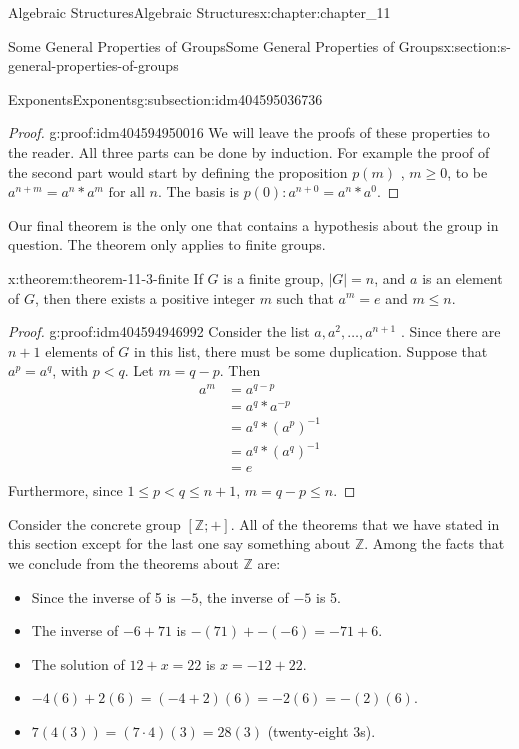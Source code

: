 \documentclass[twoside,10pt,]{book}
\numberwithin{equation}{section}
\begin{document}
\begin{chapterptx}{Algebraic Structures}{}{Algebraic Structures}{}{}{x:chapter:chapter_11}
\begin{sectionptx}{Some General Properties of Groups}{}{Some General Properties of Groups}{}{}{x:section:s-general-properties-of-groups}
\begin{subsectionptx}{Exponents}{}{Exponents}{}{}{g:subsection:idm404595036736}
\begin{proof}{}{g:proof:idm404594950016}
We will leave the proofs of these properties to the reader.  All three parts can be done by induction.  For example the proof of the second part would start by defining the proposition  \(p(m)\) , \(m\geq 0\), to be  \(a^{n+m}=a^n*a^m \textrm{ for all } n\).   The basis is \(p(0): a^{n+0}=a^n*a^0\).%
\end{proof}
Our final theorem is the only one that contains a hypothesis about the group in question. The theorem only applies to finite groups.%
\begin{theorem}{}{}{x:theorem:theorem-11-3-finite}%
If \(G\) is a finite group,  \(\left| G\right| = n\), and \(a\) is an element of \(G\), then there exists a positive integer \(m\) such that \(a^m= e\) and \(m\leq n\).%
\end{theorem}
\begin{proof}{}{g:proof:idm404594946992}
Consider the list \(a, a^2,\ldots , a^{n+1}\) . Since there are \(n + 1\) elements of \(G\) in this list, there must be some duplication.  Suppose that \(a^p=a^q\), with \(p < q\). Let \(m = q - p\).    Then%
\begin{equation*}
\begin{split}
a^m & =a^{q-p}\\
&= a^q*a^{-p}\\
&= a^q*\left(a^p\right)^{-1}\\
&= a^q *\left(a^q\right)^{-1}\\
&= e\\
\end{split}
\end{equation*}
Furthermore, since \(1\leq p < q \leq n+1\),   \(m= q-p\leq n\).%
\end{proof}
Consider the concrete group \([\mathbb{Z}; +]\). All of the theorems that we have stated in this section except for the last one say something about \(\mathbb{Z}\). Among the facts that we conclude from the theorems about \(\mathbb{Z}\) are:%
\begin{itemize}[label=\textbullet]
\item{}Since the inverse of 5 is \(-5\), the inverse of \(-5\) is 5.%
\item{}The inverse of \(-6 + 71\) is  \(-(71) + -(-6) = -71 + 6\).%
\item{}The solution of \(12 + x = 22\) is \(x = -12 + 22\).%
\item{}\(-4(6) + 2(6) = (-4 + 2)(6) = -2(6) = -(2)(6)\).%
\item{}\(7(4(3)) = (7\cdot 4)(3) = 28(3)\)  (twenty-eight 3s).%

\end{itemize}
\end{subsectionptx}
\end{sectionptx}
\end{chapterptx}
\end{document}

